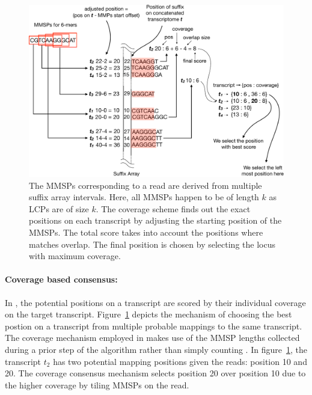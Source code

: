 \begin{figure}
 \centering
 \includegraphics[scale=0.25]{Figures/sla/max_cov-color}
 \caption[Choosing the best postion on a transcript from multiple candidates]{The MMSPs corresponding to a read 
 are derived from multiple suffix array intervals. Here, all MMSPs happen to be of length $k$ as LCPs are of 
 size $k$. The coverage scheme finds out the exact positions on each transcript by adjusting the starting position of the MMSPs. The total score takes into account the positions where matches overlap. The final position is chosen by selecting the locus with maximum coverage.}
\label{fig:maxCov}
\end{figure}

\paragraph{Coverage based consensus:}
In \sla, the potential positions on a transcript are scored by their individual coverage on the target transcript. Figure~\ref{fig:maxCov} depicts the mechanism of choosing the best postion on a transcript from multiple probable mappings to the same transcript. The coverage mechanism employed in \sla makes use of the MMSP lengths collected during a prior step of the algorithm rather than simply counting \kmers. In figure~\ref{fig:maxCov}, the transcript $t_2$ has two potential mapping positions given the reads: position 10 and 20. The coverage consensus mechanism selects position 20 over position 10 due to the higher coverage by tiling MMSPs on the read.

